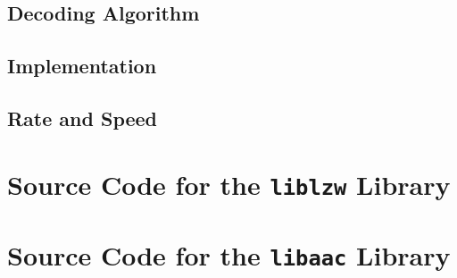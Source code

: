 \documentclass[a4paper, twocolumn]{article}
\begin{document}
        \subsection{Decoding Algorithm} \label{sec:aac_decoding_algorithm}
        \subsection{Implementation} \label{sec:aac_implementation}
        \subsection{Rate and Speed} \label{sec:aac_rate_and_speed}

    \appendix \onecolumn

    \clearpage
    \section{Source Code for the \texttt{liblzw} Library} \label{sec:liblzw}

    \clearpage
    \section{Source Code for the \texttt{libaac} Library} \label{sec:libaac}
\end{document}
